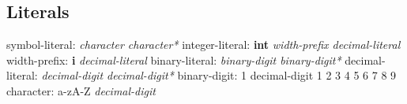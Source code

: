 \documentclass{article}
\begin{document}
  \subsection{Literals}  
  symbol-literal:\newline
  \indent \textit{character character*}\newline
  integer-literal:\newline
  \indent \textbf{int} \textit{width-prefix decimal-literal}\newline
  width-prefix:\newline
  \indent \textbf{i} \textit{decimal-literal}\newline
  binary-literal:\newline
  \indent \textit{binary-digit binary-digit*}\newline
  decimal-literal:\newline
  \indent \textit{decimal-digit decimal-digit*}\newline
  binary-digit:\newline
   1\newline
  decimal-digit\newline
   1 2 3 4 5 6 7 8 9\newline
  character:\newline
  \indent a-zA-Z \textit{decimal-digit}\newline
  
\end{document}
